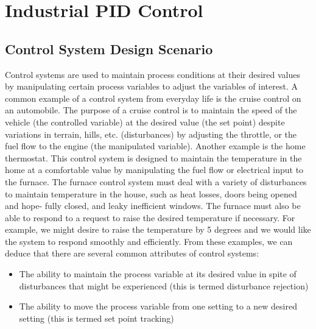 \chapter{Industrial PID Control}
\label{chap:IndustrialPID}


\section{Control System Design Scenario}
\label{sec:1}

Control systems are used to maintain process conditions at their desired values by manipulating certain process variables to adjust the variables of interest. A common example of a control system from everyday life is the cruise control on an automobile. The purpose of a cruise control is to maintain the speed of the vehicle (the controlled variable) at the desired value (the set point) despite variations in terrain, hills, etc. (disturbances) by adjusting the throttle, or the fuel flow to the engine (the manipulated variable). Another example is the home thermostat. This control system is designed to maintain the temperature in the home at a comfortable value by manipulating the fuel flow or electrical input to the furnace. The furnace control system must deal with a variety of disturbances to maintain temperature in the house, such as heat losses, doors being opened and hope- fully closed, and leaky inefficient windows. The furnace must also be able to respond to a request to raise the desired temperature if necessary. For example, we might desire to raise the temperature by 5 degrees and we would like the system to respond smoothly and efficiently. From these examples, we can deduce that there are several common attributes of control systems:
\begin{itemize}
\item The ability to maintain the process variable at its desired value in spite of disturbances that might be experienced (this is termed disturbance rejection)
\item The ability to move the process variable from one setting to a new desired setting (this is termed set point tracking)
\end{itemize}

